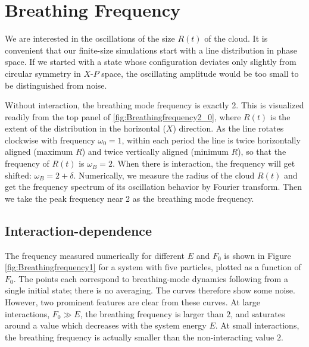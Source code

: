 \documentclass[a4paper, onecolumn]{revtex4-1}
\begin{document}
\section{Breathing Frequency}\label{sec:breathing}


We are interested in the oscillations of the size $R(t)$ of the cloud.  It is convenient that our
finite-size simulations start with a line distribution in phase space.  If we started with a state
whose configuration deviates only slightly from circular symmetry in $X$-$P$ space, the oscillating
amplitude would be too small to be distinguished from noise.

Without interaction, the breathing mode frequency is exactly 2.  This is visualized readily from the
top panel of \ref{fig:Breathingfrequency2_0}, where $R(t)$ is the extent of the distribution in the
horizontal ($X$) direction.  As the line rotates clockwise with frequency $\omega_0=1$, within each
period the line is twice horizontally aligned (maximum $R$) and twice vertically aligned (minimum
$R$), so that the frequency of $R(t)$ is $\omega_B=2$.  When there is interaction, the frequency
will get shifted: $\omega_B = 2+\delta$.  Numerically, we measure the radius of the cloud $R(t)$ and
get the frequency spectrum of its oscillation behavior by Fourier transform. Then we take the peak
frequency near 2 as the breathing mode frequency.


\subsection{Interaction-dependence}

The frequency measured numerically for different $E$ and $F_0$ is shown in Figure
\ref{fig:Breathingfrequency1} for a system with five particles, plotted as a function of $F_0$.  The
points each correspond to breathing-mode dynamics following from a single initial state; there is no
averaging.  The curves therefore show some noise.  However, two prominent features are clear from
these curves.  At large interactions, $F_0\gg E$, the breathing frequency is larger than $2$, and
saturates around a value which decreases with the system energy $E$.  At small interactions, the
breathing frequency is actually smaller than the non-interacting value $2$.
\end{document}
